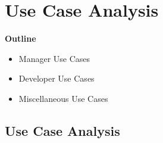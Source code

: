 % 

\section{Use Case Analysis}

\vspace{20mm}

\begin{abstract}
	\blindtext[3]
    
\end{abstract}


\vspace{20mm}

\large{\textbf{Outline}}

\begin{center}
    \begin{itemize}
        \item Manager Use Cases
        \item Developer Use Cases
        \item Miscellaneous Use Cases
    \end{itemize}
\end{center}

\pagebreak

\subsection{Use Case Analysis}
